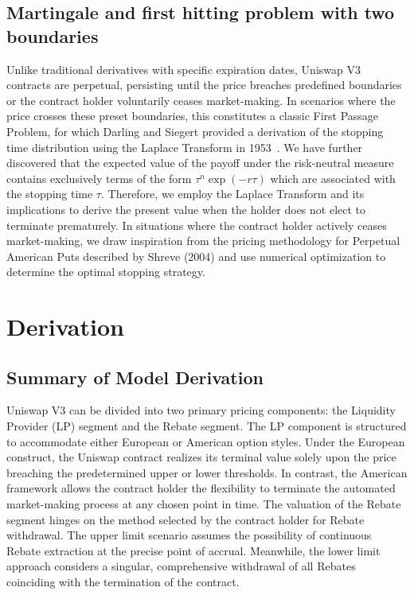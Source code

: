 \documentclass[conference]{IEEEtran}
\begin{document}
\subsection{Martingale and first hitting problem with two boundaries}
Unlike traditional derivatives with specific expiration dates, Uniswap V3 contracts are perpetual, persisting until the price breaches predefined boundaries or the contract holder voluntarily ceases market-making. In scenarios where the price crosses these preset boundaries, this constitutes a classic First Passage Problem, for which Darling and Siegert provided a derivation of the stopping time distribution using the Laplace Transform in 1953\ \cite{b5}. We have further discovered that the expected value of the payoff under the risk-neutral measure contains exclusively terms of the form $\tau^n \exp(-r\tau)$  which are associated with the stopping time $\tau$. Therefore, we employ the Laplace Transform and its implications to derive the present value when the holder does not elect to terminate prematurely. In situations where the contract holder actively ceases market-making, we draw inspiration from the pricing methodology for Perpetual American Puts described by Shreve (2004) \cite{b6} and use numerical optimization to determine the optimal stopping strategy.

\section{Derivation}

\subsection{Summary of Model Derivation}


Uniswap V3 can be divided into two primary pricing components: the Liquidity Provider (LP) segment and the Rebate segment. The LP component is structured to accommodate either European or American option styles. Under the European construct, the Uniswap contract realizes its terminal value solely upon the price breaching the predetermined upper or lower thresholds. In contrast, the American framework allows the contract holder the flexibility to terminate the automated market-making process at any chosen point in time.
The valuation of the Rebate segment hinges on the method selected by the contract holder for Rebate withdrawal. The upper limit scenario assumes the possibility of continuous Rebate extraction at the precise point of accrual. Meanwhile, the lower limit approach considers a singular, comprehensive withdrawal of all Rebates coinciding with the termination of the contract.
\end{document}
